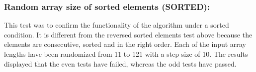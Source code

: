 \documentclass[12pt]{article}
\begin{document}
\subsubsection{Random array size of sorted elements (SORTED): }
This test was to confirm the functionality of the algorithm under a sorted condition. It is different from the reversed sorted elements test above because the elements are consecutive, sorted and in the right order. Each of the input array lengths have been randomized from 11 to 121 with a step size of 10. The results displayed that the even tests have failed, whereas the odd tests have passed.

\begin{table}[H]
	\centering
	\caption{Random array size with sorted consecutive elements}
	\label{my-label}
\end{table}
\end{document}
